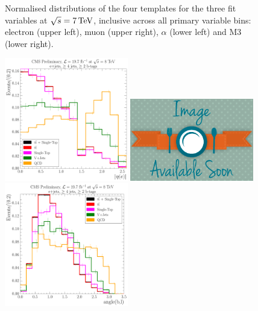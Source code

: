\begin{figure}[hbtp]
	 \caption{Normalised distributions of the four templates for the three fit variables at $\sqrt{s}=7\,\text{Te\hspace{-.08em}V}$,
	 inclusive across all primary variable bins: electron \abseta (upper left), muon \abseta (upper right),
	 $\alpha$ (lower left) and M3 (lower right).}
     \label{fig:fit_variable_distributions_7TeV}
\end{figure}

\begin{figure}[hbtp]
    \centering
     \includegraphics[width=0.48\textwidth]{Chapters/04_Analysis/04b_XSections/images/8TeV/fit_variables/MET/electron_absolute_eta/MET_inclusive_electron_absolute_eta_2orMoreBtags_templates.pdf}\hfill
     \includegraphics[width=0.48\textwidth]{Chapters/04_Analysis/04b_XSections/images/placeholder.png}\hfill
     \includegraphics[width=0.48\textwidth]{Chapters/04_Analysis/04b_XSections/images/8TeV/fit_variables/MET/angle_bl/MET_inclusive_angle_bl_2orMoreBtags_templates.pdf}\hfill

\end{figure}
